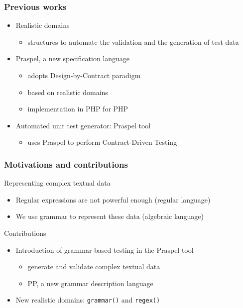 \documentclass[9pt]{beamer}
\newcommand{\code}[1]{\texttt{#1}}
\begin{document}
\begin{frame}
\frametitle{Previous works}

\begin{itemize}
\item Realistic domains
  \begin{itemize}
  \item structures to automate the validation and the generation of test data
  \end{itemize}
\item Praspel, a new specification language
  \begin{itemize}
  \item adopts Design-by-Contract paradigm
  \item based on realistic domains
  \item implementation in PHP for PHP
  \end{itemize}
\item Automated unit test generator: Praspel tool
  \begin{itemize}
  \item uses Praspel to perform Contract-Driven Testing
  \end{itemize}
\end{itemize}

\end{frame}

\begin{frame}
\frametitle{Motivations and contributions}

\begin{block}{Representing complex textual data}
\begin{itemize}
\item Regular expressions are not powerful enough (regular language)
\item We use grammar to represent these data (algebraic language)
\end{itemize}
\end{block}

\begin{block}{Contributions}
\begin{itemize}
\item Introduction of grammar-based testing in the Praspel tool
  \begin{itemize}
  \item generate and validate complex textual data
  \item PP, a new grammar description language
  \end{itemize}
\item New realistic domains: \code{grammar()} and \code{regex()}
\end{itemize}
\end{block}

\end{frame}
\end{document}
